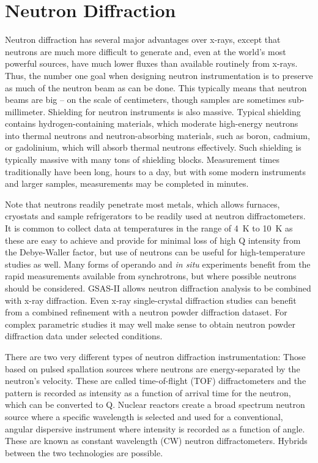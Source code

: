 \chapter{Neutron Diffraction}
Neutron diffraction has several major advantages over x-rays, except that neutrons are much more difficult to generate and, even at the world's most powerful sources, have much lower fluxes than available routinely from x-rays. Thus, the number one goal when designing neutron instrumentation is to preserve as much of the neutron beam as can be done. This typically means that neutron beams are big -- on the scale of centimeters, though samples are sometimes sub-millimeter. Shielding for neutron instruments is also massive. Typical shielding contains hydrogen-containing materials, which moderate high-energy neutrons into thermal neutrons and neutron-absorbing materials, such as boron, cadmium, or gadolinium, which will absorb thermal neutrons effectively. Such shielding is typically massive with many tons of shielding blocks. Measurement times traditionally have been long, hours to a day, but with some modern instruments and larger samples, measurements may be completed in minutes. 

Note that neutrons readily penetrate most metals, which allows furnaces, cryostats and sample refrigerators to be readily used at neutron diffractometers. It is common to collect data at temperatures in the range of 4\ K to 10\ K as these are easy to achieve and provide for minimal loss of high Q intensity from the Debye-Waller factor, but use of neutrons can be useful for high-temperature studies as well. Many forms of operando and \textit{in situ} experiments benefit from the rapid measurements available from synchrotrons, but where possible neutrons should be considered. GSAS-II allows neutron diffraction analysis to be combined with x-ray diffraction. Even x-ray single-crystal diffraction studies can benefit from a combined refinement with a neutron powder diffraction dataset. For complex parametric studies it may well make sense to obtain neutron powder diffraction data under selected conditions. 

There are two very different types of neutron diffraction instrumentation: Those based on pulsed spallation sources where neutrons are energy-separated by the neutron's velocity. These are called time-of-flight (TOF) diffractometers and the pattern is recorded as intensity as a function of arrival time for the neutron, which can be converted to Q. Nuclear reactors create a broad spectrum neutron source where a specific wavelength is selected and used for a conventional, angular dispersive instrument where intensity is recorded as a function of angle. These are known as constant wavelength (CW) neutron diffractometers. Hybrids between the two technologies are possible. 

